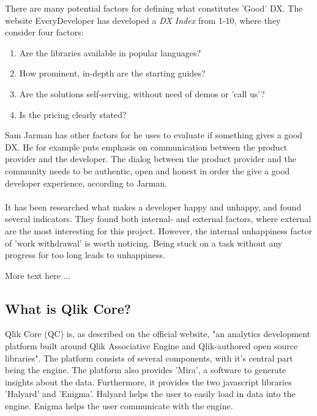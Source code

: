 \documentclass{article}
\begin{document}
There are many potential factors for defining what constitutes 'Good'
DX. The website EveryDeveloper\cite{everydeveloper} has developed a \textit{DX Index} from
1-10, where they consider four factors:

\begin{enumerate}
\item Are the libraries available in popular languages?
\item How prominent, in-depth are the starting guides?
\item Are the solutions self-serving, without need of demos or 'call us'?
\item Is the pricing clearly stated?
\end{enumerate}



Sam Jarman has other factors for he uses to evaluate
if something gives a good DX. He for example puts emphasis on
communication between the product provider and the developer.\cite{jarman} The dialog
between the product provider and the community needs to be authentic,
open and honest in order the give a good developer experience, according
to Jarman.
\\ \\
It has been researched what makes a developer
happy and unhappy\cite{unhappy}, and found several indicators. They found both
internal- and external factors, where external are the most interesting
for this project. However, the internal unhappiness factor of 'work
withdrawal' is worth noticing. Being stuck on a task without any
progress for too long leads to unhappiness.

More text here ...

\subsection{What is Qlik Core?}

Qlik Core (QC) is, as described on the official website, "an analytics
development platform built around Qlik Associative Engine and
Qlik-authored open source libraries".\cite{qlikwebsite} The
platform consists of several components, with it's central part being
the engine. The platform also provides 'Mira', a software to generate
insights about the data. Furthermore, it provides the two javascript
libraries 'Halyard' and 'Enigma'. Halyard helps the user to easily load
in data into the engine. Enigma helps the user communicate with the
engine.
\end{document}
